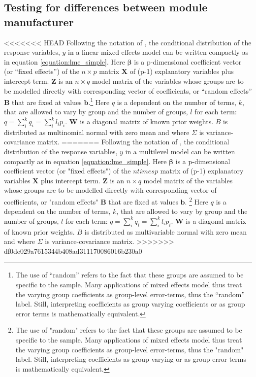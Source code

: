 \documentclass[12pt]{article}
\begin{document}
\subsection{Testing for differences between module manufacturer}
<<<<<<< HEAD
Following the notation of \citet{bates_fitting_2015}, the conditional distribution of the response variables, $y$ in a linear mixed effects model can be written compactly as in equation \ref{equation:lme_simple}. Here $\mathbf{\beta}$ is a p-dimensional coefficient vector (or  ``fixed effects'') of the $n \times p$ matrix $\mathbf{X}$ of (p-1) explanatory variables plus intercept term. $\mathbf{Z}$ is an $n \times q$ model matrix of the variables whose groups are to be modelled directly with corresponding vector of coefficients, or ``random effects'' $\mathbf{B}$ that are fixed at values $\mathbf{b}$.\footnote{The use of ``random'' refers to the fact that these groups are assumed to be specific to the sample. Many applications of mixed effects model thus treat the varying group coefficients as group-level error-terms, thus the ``random'' label. Still, interpreting coefficients as group varying coefficients or as group error terms is mathematically equivalent.} Here $q$ is a dependent on the number of terms, $k$, that are allowed to vary by group and the number of groups, $l$ for each term: $q=\sum_i^k q_i = \sum_i^k l_i p_i$.  $\mathbf{W}$ is a diagonal matrix of known prior weights. $B$ is distributed as multinomial normal with zero mean and where $\Sigma$ is variance-covariance matrix.
=======
Following the notation of \citet{bates_fitting_2015}, the conditional distribution of the response variables, $y$ in a multilevel model can be written compactly as in equation \ref{equation:lme_simple}. Here $\mathbf{\beta}$ is a p-dimensional coefficient vector (or "fixed effects") of the $n times p$ matrix of (p-1) explanatory variables $\mathbf{X}$ plus intercept term. $\mathbf{Z}$ is an $n \times q$ model matrix of the variables whose groups are to be modelled directly with corresponding vector of coefficients, or "random effects" $\mathbf{B}$ that are fixed at values $\mathbf{b}$. \footnote{The use of "random" refers to the fact that these groups are assumed to be specific to the sample. Many applications of mixed effects model thus treat the varying group coefficients as group-level error-terms, thus the "random" label. Still, interpreting coefficients as group varying or as group error terms is mathematically equivalent.} Here $q$ is a dependent on the number of terms, $k$, that are allowed to vary by group and the number of groups, $l$ for each term: $q=\sum_i^k q_i = \sum_i^k l_i p_i$.  $\mathbf{W}$ is a diagonal matrix of known prior weights. $B$ is distributed as multivariable normal with zero mean and where $\Sigma$ is variance-covariance matrix.
>>>>>>> df0de029a7615344b408ad311170086016b230a0
\end{document}
